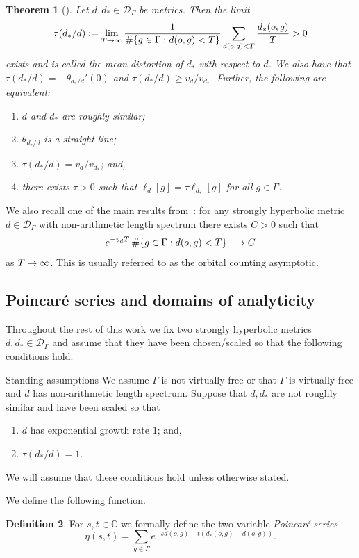 \documentclass[10pt]{amsart}
\newtheorem{theo}{Theorem}[section]
\theoremstyle{definition}\newtheorem{defi}[theo]{Definition}\newtheorem{rema}[theo]{Remark}\newtheorem{exam}[theo]{Example}\newtheorem{exem}[theo]{Example}\newtheorem{nota}[theo]{Notation}
\newcommand{\G}{\Gamma}
\newcommand{\Dc}{\mathcal{D}}
\newcommand{\C}{\mathbb{C}}
\let\originalleft\left
\let\originalright\right
\renewcommand{\left}{\mathopen{}\mathclose\bgroup\originalleft}
\renewcommand{\right}{\aftergroup\egroup\originalright}
\renewcommand*{\to}{\mathchoice{\longrightarrow}{\rightarrow}{\rightarrow}{\rightarrow}}
\theoremstyle{plain}
\newenvironment{enonce*}[2][]{\par\smallskip\noindent\textbf{#2.}\ }{\par\smallskip}
\begin{document}
\begin{theo}[{\cite[Theorem~1]{cantrell.tanaka.1}}]\label{thm.equiv}
Let $d,d_\ast \in \Dc_\G$ be metrics. Then the limit
\[
\tau(d_\ast/d) := \lim_{T\to\infty} \frac{1}{\#\left\{g\in\G: d(o,g) <T\right\}} \sum_{d(o,g) < T} \frac{d_\ast(o,g)}{T} > 0
\]
exists and is called the \emph{mean distortion} of $d_\ast$ with respect to $d$. We also have that $\tau(d_\ast/d) = - \theta_{d_\ast/d}'(0)$ and $\tau(d_\ast/d) \ge v_d/v_{d_\ast}$. Further, the following are equivalent:
\begin{enumerate}
\item\label{theo2.7.1} $d$ and $d_\ast$ are roughly similar;
\item\label{theo2.7.2} $\theta_{d_\ast/d}$ is a straight line;
\item\label{theo2.7.3} $\tau(d_\ast/d) = v_d/v_{d_\ast}$; and,
\item\label{theo2.7.4} there exists $\tau > 0$ such that $\ell_d[g] = \tau \ell_{d_\ast}[g]$ for all $g \in \G$.
\end{enumerate}
\end{theo}

We also recall one of the main results from~\cite{cantrell}: for any strongly hyperbolic metric $d \in \Dc_\G$ with non-arithmetic length spectrum there exists $C > 0$ such that
\[
e^{- v_d T} \, \#\left\{ g \in \G: d(o,g) < T\right\} \to C
\]
as $T\to\infty$. This is usually referred to as the orbital counting asymptotic.


\subsection{Poincaré series and domains of analyticity}\label{sec.analytic}
Throughout the rest of this work we fix two strongly hyperbolic metrics $d,d_\ast \in \Dc_\G$ and assume that they have been chosen/scaled so that the following conditions hold.

\begin{enonce*}[plain]{Standing assumptions}
We assume $\G$ is not virtually free or that $\G$ is virtually free and $d$ has non-arithmetic length spectrum. Suppose that $d,d_\ast$ are not roughly similar and have been scaled so that
\begin{enumerate}
\item $d$ has exponential growth rate $1$; and,
\item $\tau(d_\ast/d) = 1$.
\end{enumerate}
We will assume that these conditions hold unless otherwise stated.
\end{enonce*}
We define the following function.
\begin{defi}
For $s, t \in \C$ we formally define the two variable \emph{Poincaré series}
\[
\eta(s,t) = \sum_{g\in\G} e^{-sd(o,g) - t(d_\ast(o,g) - d(o,g))}.
\]
\end{defi}
\end{document}
